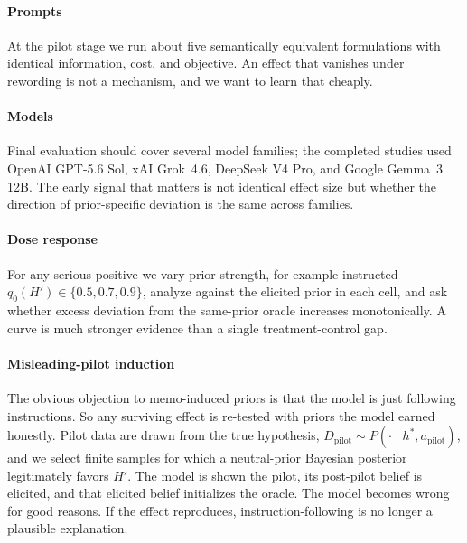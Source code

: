 \documentclass[10pt,letterpaper,twocolumn]{article}
\begin{document}
\paragraph{Prompts}
At the pilot stage we run about five semantically equivalent formulations with identical information, cost, and objective. An effect that vanishes under rewording is not a mechanism, and we want to learn that cheaply.

\paragraph{Models}
Final evaluation should cover several model families; the completed studies used OpenAI GPT-5.6 Sol, xAI Grok~4.6, DeepSeek V4 Pro, and Google Gemma~3 12B. The early signal that matters is not identical effect size but whether the direction of prior-specific deviation is the same across families.

\paragraph{Dose response}
For any serious positive we vary prior strength, for example instructed $q_0(H') \in \{0.5, 0.7, 0.9\}$, analyze against the elicited prior in each cell, and ask whether excess deviation from the same-prior oracle increases monotonically. A curve is much stronger evidence than a single treatment-control gap.

\paragraph{Misleading-pilot induction}
\label{sec:pilot}
The obvious objection to memo-induced priors is that the model is just following instructions. So any surviving effect is re-tested with priors the model earned honestly. Pilot data are drawn from the true hypothesis, $D_{\text{pilot}} \sim P(\cdot \mid h^*, a_{\text{pilot}})$, and we select finite samples for which a neutral-prior Bayesian posterior legitimately favors $H'$. The model is shown the pilot, its post-pilot belief is elicited, and that elicited belief initializes the oracle. The model becomes wrong for good reasons. If the effect reproduces, instruction-following is no longer a plausible explanation.
\end{document}
